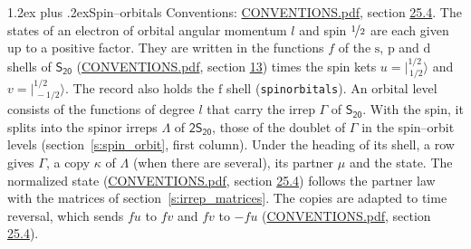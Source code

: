 \documentclass[10pt,a4paper]{article}
\makeatletter
\renewcommand\section{\@startsection{section}{1}{\z@}{-3ex plus -1ex minus -.2ex}%
  {1.2ex plus .2ex}{\normalfont\large\sffamily\bfseries\color{parttitle}}}
\numberwithin{equation}{section}
\newcommand{\grp}[1]{\mathsf{#1}}
\newcommand{\orbital}[1]{\mathrm{#1}}
\newcommand{\mult}{\kappa}
\newcommand{\intx}{\mu}
\newcommand{\jm}[2]{\bigl\lvert{}^{#1}_{\,#2}\bigr\rangle}
\makeatother
\begin{document}
\section{Spin--orbitals}\label{s:spin_orbitals}
Conventions: \href{../../CONVENTIONS.pdf}{CONVENTIONS.pdf}, section \href{../../CONVENTIONS.pdf\#conv.25.4}{25.4}.
\leavevmode\label{n:index.orbital.l}The states of an electron of orbital angular momentum $l$ and spin $\nicefrac{1}{2}$ are each given up to a positive factor. \label{n:local.spinor.uv}\label{n:local.function.f}They are written in the functions $f$ of the $\orbital{s}$, $\orbital{p}$ and $\orbital{d}$ shells of \href{../../../rotation/data/pdf/S20.pdf}{$\grp{S_{20}}$} (\href{../../CONVENTIONS.pdf}{CONVENTIONS.pdf}, section \href{../../../rotation/CONVENTIONS.pdf\#conv.13}{13}) times the spin kets $u = \jm{1/2}{1/2}$ and $v = \jm{1/2}{-1/2}$. The record also holds the $\orbital{f}$ shell (\texttt{spinorbitals}). An orbital level consists of the functions of degree $l$ that carry the irrep $\Gamma$ of \href{../../../rotation/data/pdf/S20.pdf}{$\grp{S_{20}}$}. With the spin, it splits into the spinor irreps $\Lambda$ of $\grp{2S_{20}}$, those of the doublet of $\Gamma$ in the spin--orbit levels (section~\ref{s:spin_orbit}, first column). \label{n:head.state}Under the heading of its shell, a row gives $\Gamma$, a copy $\mult$ of $\Lambda$ (when there are several), its partner $\intx$ and the state. The normalized state (\href{../../CONVENTIONS.pdf}{CONVENTIONS.pdf}, section \href{../../CONVENTIONS.pdf\#conv.25.4}{25.4}) follows the partner law with the matrices of section~\ref{s:irrep_matrices}. The copies are adapted to time reversal, which sends $f u$ to $f v$ and $f v$ to $-f u$ (\href{../../CONVENTIONS.pdf}{CONVENTIONS.pdf}, section \href{../../CONVENTIONS.pdf\#conv.25.4}{25.4}).
\end{document}

